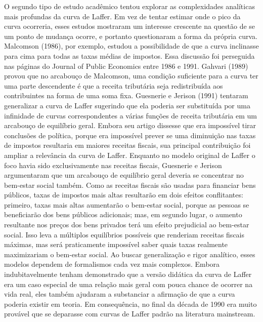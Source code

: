 \documentclass[a4paper,12pt]{article}[abntex2]
\begin{document}
O segundo tipo de estudo acadêmico tentou explorar as complexidades analíticas mais profundas da curva de Laffer. Em vez de tentar estimar onde o pico da curva ocorreria, esses estudos mostraram um interesse crescente na questão de se um ponto de mudança ocorre, e portanto questionaram a forma da própria curva. Malcomson (1986), por exemplo, estudou a possibilidade de que a curva inclinasse para cima para todas as taxas médias de impostos. Essa discussão foi perseguida nas páginas do Journal of Public Economics entre 1986 e 1991. Gahvari (1989) provou que no arcabouço de Malcomson, uma condição suficiente para a curva ter uma parte descendente é que a receita tributária seja redistribuída aos contribuintes na forma de uma soma fixa. Guesnerie e Jerison (1991) tentaram generalizar a curva de Laffer sugerindo que ela poderia ser substituída por uma infinidade de curvas correspondentes a várias funções de receita tributária em um arcabouço de equilíbrio geral. Embora seu artigo dissesse que era impossível tirar conclusões de política, porque era impossível prever se uma diminuição nas taxas de impostos resultaria em maiores receitas fiscais, sua principal contribuição foi ampliar a relevância da curva de Laffer. Enquanto no modelo original de Laffer o foco havia sido exclusivamente nas receitas fiscais, Guesnerie e Jerison argumentaram que um arcabouço de equilíbrio geral deveria se concentrar no bem-estar social também. Como as receitas fiscais são usadas para financiar bens públicos, taxas de impostos mais altas resultarão em dois efeitos conflitantes: primeiro, taxas mais altas aumentarão o bem-estar social, porque as pessoas se beneficiarão dos bens públicos adicionais; mas, em segundo lugar, o aumento resultante nos preços dos bens privados terá um efeito prejudicial ao bem-estar social. Isso leva a múltiplos equilíbrios possíveis que renderiam receitas fiscais máximas, mas será praticamente impossível saber quais taxas realmente maximizariam o bem-estar social. Ao buscar generalização e rigor analítico, esses modelos dependem de formalismos cada vez mais complexos. Embora indubitavelmente tenham demonstrado que a versão didática da curva de Laffer era um caso especial de uma relação mais geral com pouca chance de ocorrer na vida real, eles também ajudaram a substanciar a afirmação de que a curva poderia existir em teoria. Em consequência, no final da década de 1990 era muito provável que se deparasse com curvas de Laffer padrão na literatura mainstream.
\end{document}
